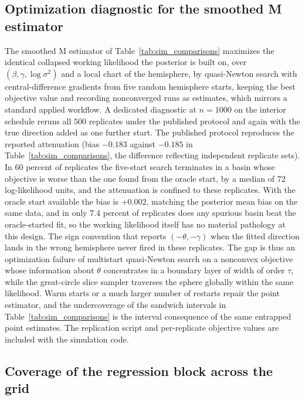 \documentclass[11pt]{article}
\theoremstyle{definition}
\theoremstyle{plain}
\begin{document}
\subsection{Optimization diagnostic for the smoothed M estimator}
\label{sec:mle_diagnostic}

The smoothed M estimator of Table~\ref{tab:sim_comparisons} maximizes the identical collapsed working likelihood the posterior is built on, over $(\beta,\gamma,\log\sigma^2)$ and a local chart of the hemisphere, by quasi-Newton search with central-difference gradients from five random hemisphere starts, keeping the best objective value and recording nonconverged runs as estimates, which mirrors a standard applied workflow. A dedicated diagnostic at $n=1000$ on the interior schedule reruns all $500$ replicates under the published protocol and again with the true direction added as one further start. The published protocol reproduces the reported attenuation (bias $-0.183$ against $-0.185$ in Table~\ref{tab:sim_comparisons}, the difference reflecting independent replicate sets). In $60$ percent of replicates the five-start search terminates in a basin whose objective is worse than the one found from the oracle start, by a median of $72$ log-likelihood units, and the attenuation is confined to these replicates. With the oracle start available the bias is $+0.002$, matching the posterior mean bias on the same data, and in only $7.4$ percent of replicates does any spurious basin beat the oracle-started fit, so the working likelihood itself has no material pathology at this design. The sign convention that reports $(-\theta,-\gamma)$ when the fitted direction lands in the wrong hemisphere never fired in these replicates. The gap is thus an optimization failure of multistart quasi-Newton search on a nonconvex objective whose information about $\theta$ concentrates in a boundary layer of width of order $\tau$, while the great-circle slice sampler traverses the sphere globally within the same likelihood. Warm starts or a much larger number of restarts repair the point estimator, and the undercoverage of the sandwich intervals in Table~\ref{tab:sim_comparisons} is the interval consequence of the same entrapped point estimates. The replication script and per-replicate objective values are included with the simulation code.

\subsection{Coverage of the regression block across the grid}
\end{document}
